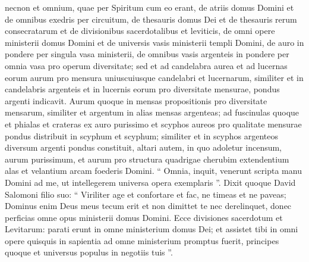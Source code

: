 \begin{biblechapter}
\begin{biblechapter}
\begin{biblechapter}
\begin{biblechapter}
\begin{biblechapter}
\begin{biblechapter}
\begin{biblechapter}
\begin{biblechapter}
\begin{biblechapter}
\begin{biblechapter}
\begin{biblechapter}
\begin{biblechapter}
\begin{biblechapter}
\begin{biblechapter}
\begin{biblechapter}
\begin{biblechapter}
\begin{biblechapter}
\begin{biblechapter}
\begin{biblechapter}
\begin{biblechapter}
\begin{biblechapter}
\begin{biblechapter}
\begin{biblechapter}
\begin{biblechapter}
\begin{biblechapter}
\begin{biblechapter}
\begin{biblechapter}
\begin{biblechapter}
 \verse necnon et omnium, quae per Spiritum cum eo erant, de atriis domus Domini et de omnibus exedris per circuitum, de thesauris domus Dei et de thesauris rerum consecratarum 
\verse et de divisionibus sacerdotalibus et leviticis, de omni opere ministerii domus Domini et de universis vasis ministerii templi Domini, 
 \verse de auro in pondere per singula vasa ministerii, de omnibus vasis argenteis in pondere per omnia vasa pro operum diversitate; 
\verse sed et ad candelabra aurea et ad lucernas eorum aurum pro mensura uniuscuiusque candelabri et lucernarum, similiter et in candelabris argenteis et in lucernis eorum pro diversitate mensurae, pondus argenti indicavit. 
\verse Aurum quoque in mensas propositionis pro diversitate mensarum, similiter et argentum in alias mensas argenteas; 
 \verse ad fuscinulas quoque et phialas et crateras ex auro purissimo et scyphos aureos pro qualitate mensurae pondus distribuit in scyphum et scyphum; similiter et in scyphos argenteos diversum argenti pondus constituit, 
\verse altari autem, in quo adoletur incensum, aurum purissimum, et aurum pro structura quadrigae cherubim extendentium alas et velantium arcam foederis Domini. 
\verse “ Omnia, inquit, venerunt scripta manu Domini ad me, ut intellegerem universa opera exemplaris ”.
 \verse Dixit quoque David Salomoni filio suo: “ Viriliter age et confortare et fac, ne timeas et ne paveas; Dominus enim Deus meus tecum erit et non dimittet te nec derelinquet, donec perficias omne opus ministerii domus Domini. 
\verse Ecce divisiones sacerdotum et Levitarum: parati erunt in omne ministerium domus Dei; et assistet tibi in omni opere quisquis in sapientia ad omne ministerium promptus fuerit, principes quoque et universus populus in negotiis tuis ”.
 

\end{biblechapter}
\end{biblechapter}
\end{biblechapter}
\end{biblechapter}
\end{biblechapter}
\end{biblechapter}
\end{biblechapter}
\end{biblechapter}
\end{biblechapter}
\end{biblechapter}
\end{biblechapter}
\end{biblechapter}
\end{biblechapter}
\end{biblechapter}
\end{biblechapter}
\end{biblechapter}
\end{biblechapter}
\end{biblechapter}
\end{biblechapter}
\end{biblechapter}
\end{biblechapter}
\end{biblechapter}
\end{biblechapter}
\end{biblechapter}
\end{biblechapter}
\end{biblechapter}
\end{biblechapter}
\end{biblechapter}
